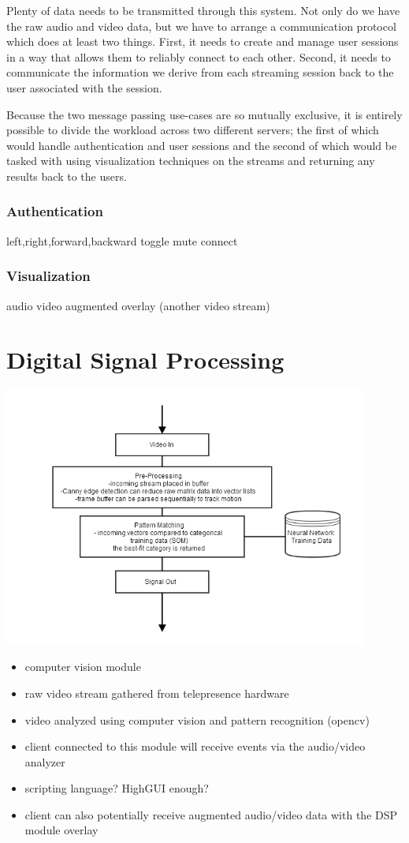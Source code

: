 \documentclass[a4paper,12pt]{report}
\begin{document}
	Plenty of data needs to be transmitted through this system. Not only do we have the raw audio and video data, but we have to arrange a communication protocol which does at least two things. First, it needs to create and manage user sessions in a way that allows them to reliably connect to each other. Second, it needs to communicate the information we derive from each streaming session back to the user associated with the session.
		
	Because the two message passing use-cases are so mutually exclusive, it is entirely possible to divide the workload across two different servers; the first of which would handle authentication and user sessions and the second of which would be tasked with using visualization techniques on the streams and returning any results back to the users.
		\subsubsection{Authentication}
			left,right,forward,backward
			toggle mute
			connect
		\subsubsection{Visualization}
			audio
			video
			augmented overlay (another video stream)


\section{Digital Signal Processing}
\includegraphics[width=12cm]{signalProcessing}
\begin{itemize}
	\item computer vision module
	\item raw video stream gathered from telepresence hardware
	\item video analyzed using computer vision and pattern recognition (opencv)
	\item client connected to this module will receive events via the audio/video analyzer
	\item scripting language? HighGUI enough?
	\item client can also potentially receive augmented audio/video data with the DSP module overlay
\end{itemize}
	
\end{document}
